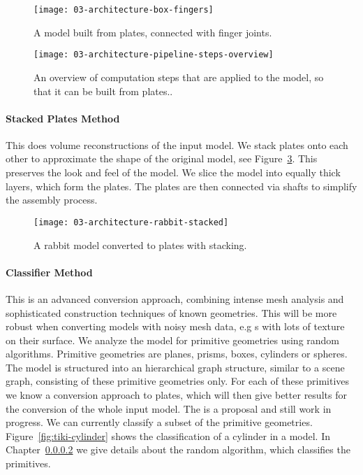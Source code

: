 \documentclass[../03-Architecture.tex]{subfiles}
\begin{document}
\begin{figure}[h]
  \centering
  \texttt{[image: 03-architecture-box-fingers]}
  \caption{A model built from plates, connected with finger
    joints.}
  \label{fig:model-fingers}
\end{figure}

\begin{figure}[h]
  \centering
  \texttt{[image: 03-architecture-pipeline-steps-overview]}
  \caption{An overview of computation steps that are applied
    to the model, so that it can be built from plates..}
  \label{fig:overview-plate-steps}
\end{figure}



\paragraph{Stacked Plates Method}

This \class{\fabmethod} does volume reconstructions of the
input model. We stack plates onto each other to approximate
the shape of the original model, see
Figure~\ref{fig:stacked-rabbit}. This preserves the look and
feel of the model. We slice the model into equally thick
layers, which form the plates. The plates are then connected
via shafts to simplify the assembly process.

\begin{figure}[h]
  \centering
  \texttt{[image: 03-architecture-rabbit-stacked]}
  \caption{A rabbit model converted to plates with
    stacking.}
  \label{fig:stacked-rabbit}
\end{figure}

\paragraph{Classifier Method}

This is an advanced conversion approach, combining intense
mesh analysis and sophisticated construction techniques of
known geometries. This \class{\fabmethod} will be more
robust when converting models with noisy mesh data, e.g
{\threedmodel}s with lots of texture on their surface. We
analyze the model for primitive geometries using random
algorithms. Primitive geometries are planes, prisms, boxes,
cylinders or spheres. The model is structured into an
hierarchical graph structure, similar to a scene graph,
consisting of these primitive geometries only. For each of
these primitives we know a conversion approach to plates,
which will then give better results for the conversion of
the whole input model. The  is a
proposal and still work in progress. We can currently
classify a subset of the primitive geometries.
Figure~\ref{fig:tiki-cylinder} shows the classification of a
cylinder in a model. In Chapter~\ref{}  we give details about the random algorithm,
which classifies the primitives.
\end{document}
